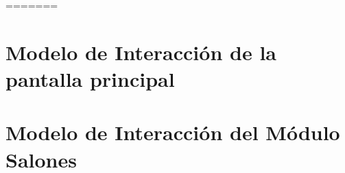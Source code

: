 %
%

=======

\newpage 
\section{Modelo de Interacción de la pantalla principal}

\section{Modelo de Interacción del Módulo Salones}

